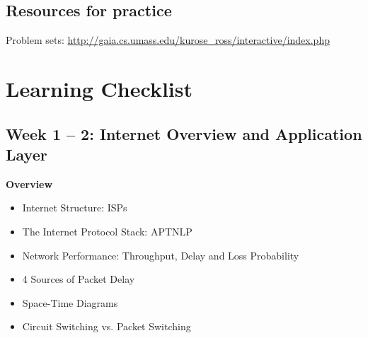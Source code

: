 \documentclass[a4paper]{article}
\begin{document}
\subsection*{Resources for practice}
Problem sets: \url{http://gaia.cs.umass.edu/kurose_ross/interactive/index.php}

\section*{Learning Checklist}
\subsection*{Week 1 -- 2: Internet Overview and Application Layer}

\noindent\textbf{Overview}
\begin{itemize}[label=$\square$]
    \item Internet Structure: ISPs
    \item The Internet Protocol Stack: APTNLP
    \item Network Performance: Throughput, Delay and Loss Probability
    \item 4 Sources of Packet Delay
    \item Space-Time Diagrams
    \item Circuit Switching vs. Packet Switching
\end{itemize}
\end{document}
